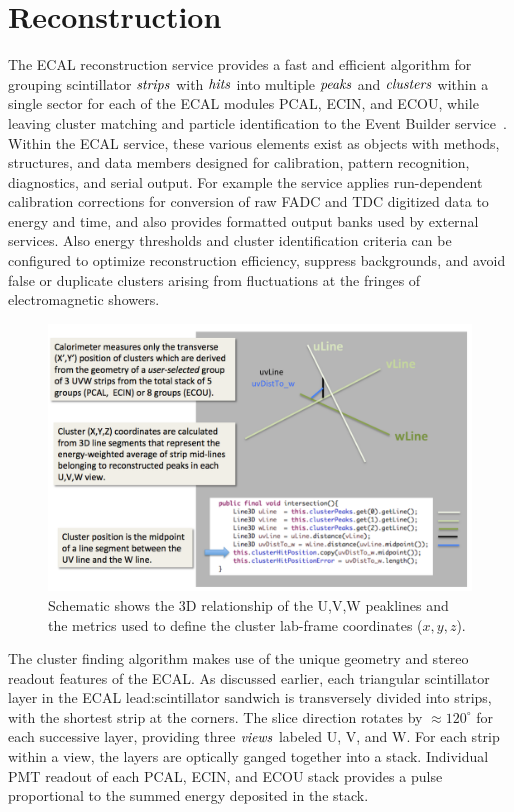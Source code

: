 \section{Reconstruction}

The ECAL reconstruction service provides a fast and efficient algorithm for grouping scintillator ${\it strips}$
with ${\it hits}$ into multiple ${\it peaks}$ and ${\it clusters}$ within a single sector for each of the ECAL
modules PCAL, ECIN, and ECOU, while leaving cluster matching and particle identification to the Event Builder
service~\cite{nim:recon}. Within the ECAL service, these various elements exist as objects with methods,
structures, and data members designed for calibration, pattern recognition, diagnostics, and serial output. For
example the service applies run-dependent calibration corrections for conversion of raw FADC and TDC digitized
data to energy and time, and also provides formatted output banks used by external services. Also energy thresholds
and cluster identification criteria can be configured to optimize reconstruction efficiency, suppress backgrounds,
and avoid false or duplicate clusters arising from fluctuations at the fringes of electromagnetic showers. 

\begin{figure}[hbt]
\centering
\includegraphics[width=0.95\columnwidth,keepaspectratio]{img/S6_0.png}
\caption{Schematic shows the 3D relationship of the U,V,W peaklines and the metrics used to define the cluster
  lab-frame coordinates ($x,y,z$).}
\label{fig:S6_0}
\end{figure}

The cluster finding algorithm makes use of the unique geometry and stereo readout features of the ECAL. As
discussed earlier, each triangular scintillator layer in the ECAL lead:scintillator sandwich is transversely divided
into strips, with the shortest strip at the corners. The slice direction rotates by $\approx 120^{\circ}$ for each
successive layer, providing three ${\it views}$ labeled U, V, and W. For each strip within a view, the layers are
optically ganged together into a stack. Individual PMT readout of each PCAL, ECIN, and ECOU stack provides a
pulse proportional to the summed energy deposited in the stack.

